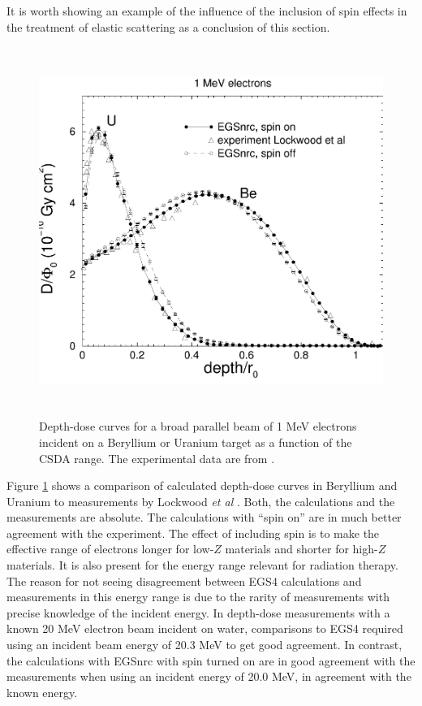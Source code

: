 It is worth showing an example of the influence of the inclusion
of spin effects in the treatment of elastic scattering as
a conclusion of this section.
\begin{figure}[htp]
\includegraphics[height=12cm,width=12cm]{figures/dd_1MeV_Be_and_U}
\caption[Depth-dose curves in Beryllium and Uranium]{\label{dd_spin}
Depth-dose curves
for a broad parallel beam of 1 MeV electrons incident
on a Beryllium or Uranium target as a function of the CSDA range.
The experimental data are from \protect\cite{Lo80a}.}
\end{figure}
Figure \ref{dd_spin} shows a comparison of calculated depth-dose curves
in Beryllium and Uranium to measurements by Lockwood {\em et al} \cite{Lo80a}.
Both, the calculations and the measurements are absolute.
The calculations with ``spin on'' are in much better agreement
with the experiment. The effect of including spin is
to make the effective range of electrons longer for low-$Z$
materials and shorter for high-$Z$ materials. It is also
present for the energy range relevant for radiation therapy.
The reason for not seeing disagreement between EGS4 calculations
and measurements in this energy range is due to the rarity of
measurements
with precise knowledge of the incident energy. In depth-dose measurements
with a known 20 MeV electron beam incident on water, comparisons to EGS4
required using an incident beam energy of 20.3 MeV to get good
agreement\cite{Ro95}. In contrast, the calculations with EGSnrc with spin
turned on are in good
agreement with the measurements when using an incident energy of 20.0 MeV,
in agreement with the known energy.

